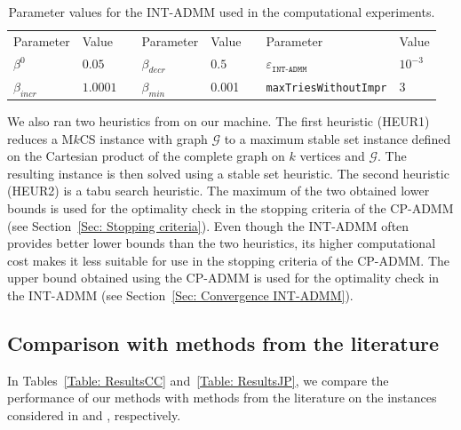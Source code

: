 \documentclass[11pt, a4paper]{article}
\newcommand{\mc}{\mathcal}
\newcommand{\eps}{\varepsilon}
\begin{document}
\begin{table}[H]
\centering
\caption{Parameter values for the INT-ADMM used in the computational experiments.}
\label{tab:parameters INT-ADMM}
\begin{tabular}{@{}llllllll@{}}
\toprule
Parameter & Value &  & Parameter & Value &  & Parameter & Value \\ \cmidrule(r){1-2} \cmidrule(lr){4-5} \cmidrule(l){7-8} 
$\beta^0$ & $0.05$ &  & $\beta_{decr}$ & $0.5$ &  & $\eps_\texttt{INT-ADMM}$ & $10^{-3}$ \\
$\beta_{incr}$ & $1.0001$ &  & $\beta_{min}$ & 0.001 &  & \texttt{maxTriesWithoutImpr} & $3$ \\ \bottomrule
\end{tabular}
\end{table}

We also ran two heuristics from \cite{Kuryatnikova2022MkCSProblem} on our machine.
The first heuristic (HEUR1) reduces a M$k$CS instance with graph $\mc{G}$ to a maximum stable set instance defined on the Cartesian product of the complete graph on $k$ vertices and $\mc{G}$.
The resulting instance is then solved using a stable set heuristic.
The second heuristic (HEUR2) is a tabu search heuristic.
The maximum of the two obtained lower bounds is used for the optimality check in the stopping criteria of the CP-ADMM (see Section~\ref{Sec: Stopping criteria}).
Even though the INT-ADMM often provides better lower bounds than the two heuristics, its higher computational cost makes it less suitable for use in the stopping criteria of the CP-ADMM.
The upper bound obtained using the CP-ADMM is used for the optimality check in the INT-ADMM (see Section~\ref{Sec: Convergence INT-ADMM}).

\subsection{Comparison with methods from the literature} \label{Sec: Comparison with methods from the literature}
In Tables~\ref{Table: ResultsCC} and~\ref{Table: ResultsJP}, we compare the performance of our methods with methods from the literature on the instances considered in \cite{Campelo2010ILPLagr} and \cite{Januschowski2011ILPSym}, respectively.
\end{document}
